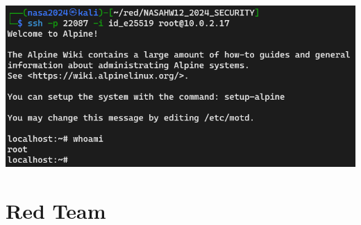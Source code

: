 \documentclass[12pt, a4paper]{article}
\begin{document}
\begin{enumerate}[label=(\alph*)]
    \includegraphics[width=\linewidth]{1-e_result.png}
  \end{enumerate}

  \pagebreak
  \section{Red Team}
\end{document}
